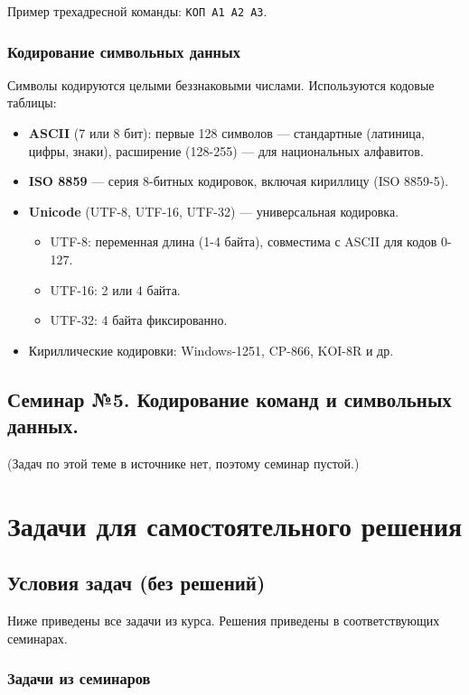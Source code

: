 \documentclass[a4paper,14pt]{report}
\begin{document}
Пример трехадресной команды: \texttt{КОП А1 А2 А3}.

\subsection{Кодирование символьных данных}
Символы кодируются целыми беззнаковыми числами. Используются кодовые таблицы:

\begin{itemize}
    \item \textbf{ASCII} (7 или 8 бит): первые 128 символов — стандартные (латиница, цифры, знаки), расширение (128-255) — для национальных алфавитов.
    \item \textbf{ISO 8859} — серия 8-битных кодировок, включая кириллицу (ISO 8859-5).
    \item \textbf{Unicode} (UTF-8, UTF-16, UTF-32) — универсальная кодировка.
    \begin{itemize}
        \item UTF-8: переменная длина (1-4 байта), совместима с ASCII для кодов 0-127.
        \item UTF-16: 2 или 4 байта.
        \item UTF-32: 4 байта фиксированно.
    \end{itemize}
    \item Кириллические кодировки: Windows-1251, CP-866, KOI-8R и др.
\end{itemize}

\section{Семинар №5. Кодирование команд и символьных данных.}
(Задач по этой теме в источнике нет, поэтому семинар пустой.)


\chapter{Задачи для самостоятельного решения}
\section*{Условия задач (без решений)}

Ниже приведены все задачи из курса. Решения приведены в соответствующих семинарах.

\subsection*{Задачи из семинаров}
\end{document}
